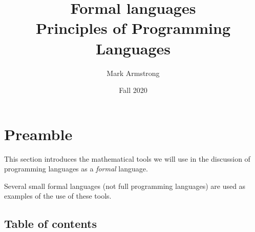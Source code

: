 \documentclass[11pt]{article}
\author{Mark Armstrong}
\date{Fall 2020}
\title{Formal languages\\\medskip
\large Principles of Programming Languages}
\theoremstyle{definition}
\begin{document}
\maketitle

\section{Preamble}
\label{sec:orgb531786}
This section introduces the mathematical tools
we will use in the discussion of programming languages
as a \emph{formal} language.

Several small formal languages (not full programming languages)
are used as examples of the use of these tools.

\subsection{Table of contents}
\label{sec:org9fed79f}
\end{document}
